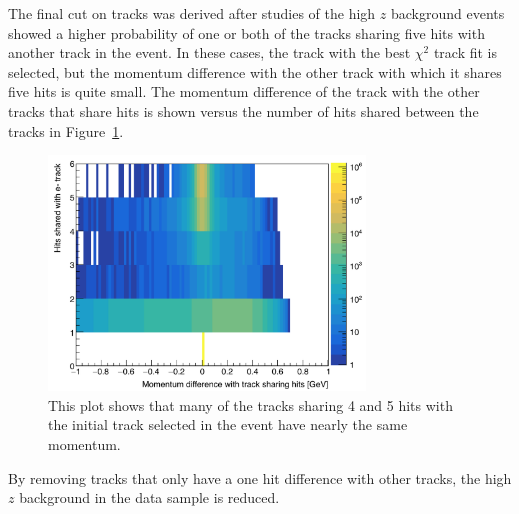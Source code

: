 The final cut on tracks was derived after studies of the high $z$ background events showed a higher probability of one or both of the tracks sharing five hits with another track in the event. In these cases, the track with the best $\chi^2$ track fit is selected, but the momentum difference with the other track with which it shares five hits is quite small. The momentum difference of the track with the other tracks that share hits is shown versus the number of hits shared between the tracks in Figure~\ref{fig:trkshare}.

\begin{figure}[htb]
  \centering
      \includegraphics[width=0.75\textwidth]{pics/searching/TrkShareHits.png}
  \caption[Cut on shared hits between tracks]{This plot shows that many of the tracks sharing 4 and 5 hits with the initial track selected in the event have nearly the same momentum.}
  \label{fig:trkshare}
\end{figure} 

By removing tracks that only have a one hit difference with other tracks, the high $z$ background in the data sample is reduced.   
